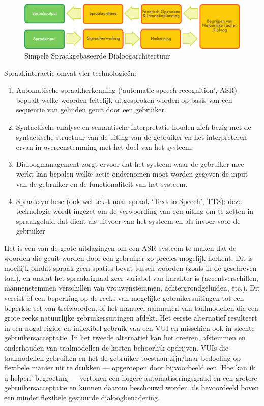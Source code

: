 \documentclass[]{../../metanetpaper}
\begin{document}
\begin{multicols}{2}
\begin{figure}[htb]
  \center  \includegraphics[width=\textwidth]{../_media/dutch/simple_speech-based_dialogue_architecture}
  \center
  \caption{Simpele Spraakgebaseerde Dialoogarchitectuur}
  \label{fig:dialoguearch_de}
\end{figure}

    Spraakinteractie omvat vier technologie{\"e}n:
    \begin{enumerate}
    \item Automatische spraakherkenning (`automatic speech recognition', ASR) bepaalt welke woorden feitelijk uitgesproken worden op basis van een sequentie van geluiden geuit door een gebruiker.
 	\item Syntactische analyse en semantische interpretatie houden zich bezig met de syntactische structuur van de uiting van de gebruiker en het interpreteren ervan in overeenstemming met het doel van het systeem.
 	\item Dialoogmanagement zorgt ervoor dat het systeem waar de gebruiker mee werkt kan bepalen welke actie ondernomen moet worden gegeven de input van de gebruiker en de functionaliteit van het systeem.
 	\item Spraaksynthese (ook wel tekst-naar-spraak `Text-to-Speech', TTS): deze technologie wordt ingezet om de verwoording van een uiting om te zetten in spraakgeluid dat dient als uitvoer van het systeem en als invoer voor de gebruiker
    \end{enumerate}

    Het is een van de grote uitdagingen om een ASR-systeem te maken dat de woorden die geuit worden door een gebruiker zo precies mogelijk herkent. Dit is moeilijk omdat spraak geen spaties bevat tussen woorden (zoals in de geschreven taal), en omdat het spraaksignaal zeer variabel van karakter is (accentverschillen, mannenstemmen verschillen van vrouwenstemmen, achtergrondgeluiden, etc.). Dit vereist {\`o}f een beperking op de reeks van mogelijke gebruikersuitingen tot een beperkte set van trefwoorden, {\`o}f het manueel aanmaken van taalmodellen die een grote reeks natuurlijke gebruikersuitingen afdekt. Het eerste alternatief resulteert in een nogal rigide en inflexibel gebruik van een VUI en misschien ook in slechte gebruikersacceptatie. In het tweede alternatief kan het cre{\"e}ren, afstemmen en onderhouden van taalmodellen de kosten behoorlijk opdrijven. VUIs die taalmodellen gebruiken en het de gebruiker toestaan zijn/haar bedoeling op flexibele manier uit te drukken --- opgeroepen door bijvoorbeeld een `Hoe kan ik u helpen' begroeting --- vertonen een hogere automatiseringsgraad en een grotere gebruikersacceptatie en kunnen daarom beschouwd worden als bevoordeeld boven een minder flexibele gestuurde dialoogbenadering.


\end{multicols}
\end{document}
